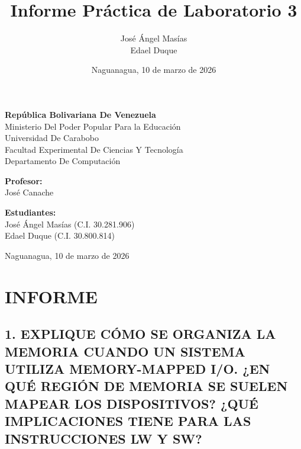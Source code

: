 \documentclass[12pt]{article}
\title{Informe Práctica de Laboratorio 3}
\author{José Ángel Masías \\ Edael Duque}
\date{Naguanagua, 10 de marzo de 2026}
\begin{document}
\maketitle

\begin{center}
\textbf{República Bolivariana De Venezuela} \\
Ministerio Del Poder Popular Para la Educación \\
Universidad De Carabobo \\
Facultad Experimental De Ciencias Y Tecnología \\
Departamento De Computación \\
\end{center}

\vspace{1cm}

\begin{center}
\textbf{Profesor:} \\
José Canache \\
\end{center}

\vspace{1cm}

\begin{center}
\textbf{Estudiantes:} \\
José Ángel Masías (C.I. 30.281.906) \\
Edael Duque (C.I. 30.800.814) \\
\end{center}

\vspace{1cm}

\begin{center}
Naguanagua, 10 de marzo de 2026
\end{center}

\newpage

\section*{INFORME}

\subsection*{1. EXPLIQUE CÓMO SE ORGANIZA LA MEMORIA CUANDO UN SISTEMA UTILIZA MEMORY-MAPPED I/O. ¿EN QUÉ REGIÓN DE MEMORIA SE SUELEN MAPEAR LOS DISPOSITIVOS? ¿QUÉ IMPLICACIONES TIENE PARA LAS INSTRUCCIONES LW Y SW?}
\end{document}

